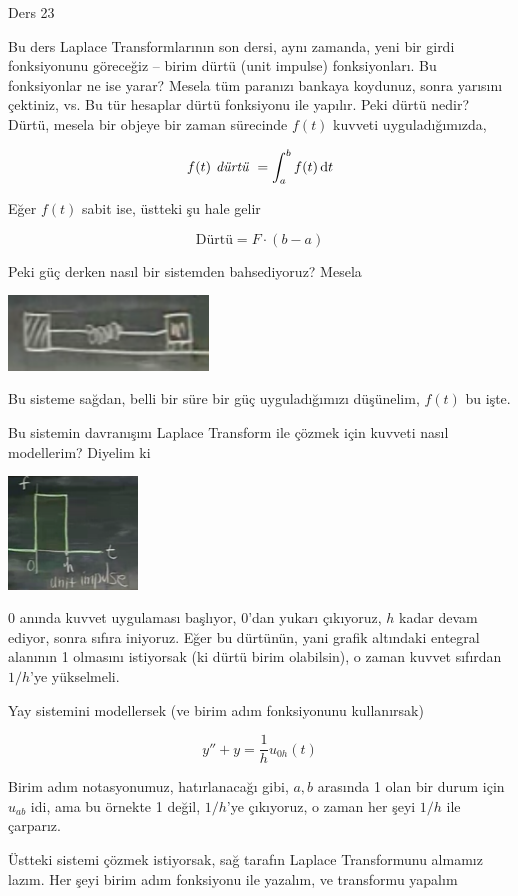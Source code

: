 \documentclass[12pt,fleqn]{article}\usepackage{../../common}
\begin{document}
Ders 23 

Bu ders Laplace Transformlarının son dersi, aynı zamanda, yeni bir girdi
fonksiyonunu göreceğiz -- birim dürtü (unit impulse) fonksiyonları. Bu
fonksiyonlar ne ise yarar? Mesela tüm paranızı bankaya koydunuz, sonra
yarısını çektiniz, vs. Bu tür hesaplar dürtü fonksiyonu ile yapılır. Peki
dürtü nedir? Dürtü, mesela bir objeye bir zaman sürecinde $f(t)$ kuvveti
uyguladığımızda,

$$ f(t) \textit{ dürtü } = \int_{a}^{b}f(t) \,\mathrm{d} t $$

Eğer $f(t)$ sabit ise, üstteki şu hale gelir

$$ \textrm{Dürtü} = F \cdot (b-a) $$

Peki güç derken nasıl bir sistemden bahsediyoruz? Mesela

\includegraphics[height=2cm]{23_1.png}

Bu sisteme sağdan, belli bir süre bir güç uyguladığımızı düşünelim, $f(t)$
bu işte. 

Bu sistemin davranışını Laplace Transform ile çözmek için kuvveti nasıl
modellerim? Diyelim ki 

\includegraphics[height=3cm]{23_2.png}

0 anında kuvvet uygulaması başlıyor, 0'dan yukarı çıkıyoruz, $h$ kadar
devam ediyor, sonra sıfıra iniyoruz. Eğer bu dürtünün, yani grafik altındaki
entegral alanının 1 olmasını istiyorsak (ki dürtü birim olabilsin), o zaman
kuvvet sıfırdan $1/h$'ye yükselmeli. 

Yay sistemini modellersek (ve birim adım fonksiyonunu kullanırsak)

$$ y'' + y  = \frac{1}{h}u_{0h}(t) $$

Birim adım notasyonumuz, hatırlanacağı gibi, $a,b$ arasında 1 olan bir
durum için $u_{ab}$ idi, ama bu örnekte 1 değil, $1/h$'ye çıkıyoruz, o
zaman her şeyi $1/h$ ile çarparız.

Üstteki sistemi çözmek istiyorsak, sağ tarafın Laplace Transformunu almamız
lazım. Her şeyi birim adım fonksiyonu ile yazalım, ve transformu yapalım
\end{document}
